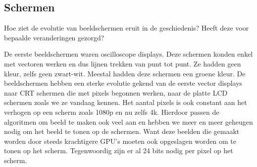 \documentclass[../main.tex]{subfiles}
\begin{document}
\subsection{Schermen}
\begin{question}
	Hoe ziet de evolutie van beeldschermen eruit in de geschiedenis? Heeft deze voor bepaalde veranderingen gezorgd?
\end{question}

\begin{solution}
	De eerste beeldschermen waren oscilloscope displays. Deze schermen konden enkel met vectoren werken en dus lijnen trekken van punt tot punt. Ze hadden geen kleur, zelfs geen zwart-wit. Meestal hadden deze schermen een groene kleur.
	De beeldschermen hebben een sterke evolutie gekend van de eerste vector displays naar CRT schermen die met pixels begonnen werken, naar de platte LCD schermen zoals we ze vandaag kennen. Het aantal pixels is ook constant aan het verhogen op een scherm zoals 1080p en nu zelfs 4k. Hierdoor passen de algoritmen om beeld te maken ook veel aan en hebben we meer en meer geheugen nodig om het beeld te tonen op de schermen. Want deze beelden die gemaakt worden door steeds krachtigere GPU's moeten ook opgeslagen worden om te tonen op het scherm.
	Tegenwoordig zijn er al 24 bits nodig per pixel op het scherm.
\end{solution}
\end{document}

